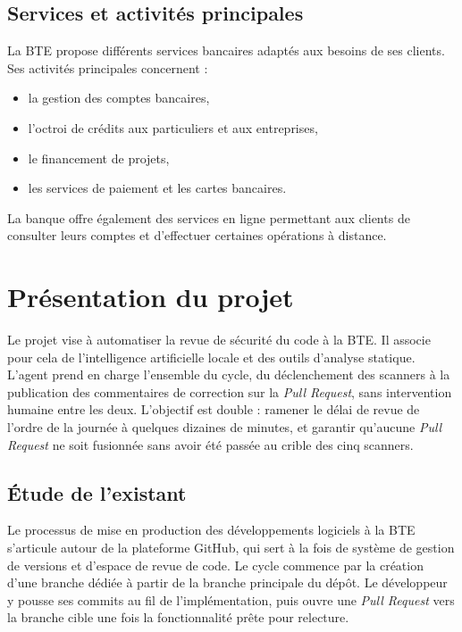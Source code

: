     \subsection{Services et activités principales}

        La BTE propose différents services bancaires adaptés aux besoins de ses clients.
        Ses activités principales concernent :
        \begin{itemize}
            \item la gestion des comptes bancaires,
            \item l'octroi de crédits aux particuliers et aux entreprises,
            \item le financement de projets,
            \item les services de paiement et les cartes bancaires.
        \end{itemize}

        La banque offre également des services en ligne permettant aux clients de
        consulter leurs comptes et d'effectuer certaines opérations à distance.

\section{Présentation du projet}

    Le projet vise à automatiser la revue de sécurité du code à la BTE. Il associe
    pour cela de l'intelligence artificielle locale et des outils d'analyse statique. L'agent
    prend en charge l'ensemble du cycle, du déclenchement des scanners à la publication
    des commentaires de correction sur la \textit{Pull Request}, sans intervention
    humaine entre les deux. L'objectif est double : ramener le délai de revue de
    l'ordre de la journée à quelques dizaines de minutes, et garantir qu'aucune
    \textit{Pull Request} ne soit fusionnée sans avoir été passée au crible des
    cinq scanners.

    \subsection{Étude de l'existant}

        Le processus de mise en production des développements logiciels à la BTE
        s'articule autour de la plateforme GitHub, qui sert à la fois de système de
        gestion de versions et d'espace de revue de code. Le cycle commence par la
        création d'une branche dédiée à partir de la branche principale du dépôt.
        Le développeur y pousse ses commits au fil de l'implémentation, puis ouvre
        une \textit{Pull Request} vers la branche cible une fois la fonctionnalité
        prête pour relecture.

